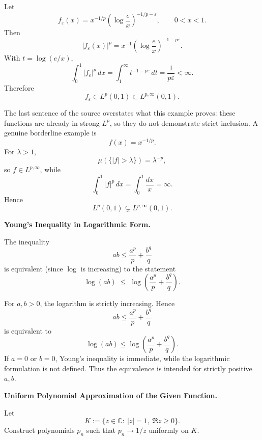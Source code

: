 \begin{solution}
Let
\[
f_\varepsilon(x)
=
x^{-1/p}
\left(\log\frac ex\right)^{-1/p-\varepsilon},
\qquad 0<x<1.
\]
Then
\[
|f_\varepsilon(x)|^p
=
x^{-1}
\left(\log\frac ex\right)^{-1-p\varepsilon}.
\]
With \(t=\log(e/x)\),
\[
\int_0^1|f_\varepsilon|^p\,dx
=
\int_1^\infty t^{-1-p\varepsilon}\,dt
=
\frac1{p\varepsilon}<\infty.
\]
Therefore
\[
\boxed{
f_\varepsilon\in L^p(0,1)\subset L^{p,\infty}(0,1).
}
\]

The last sentence of the source overstates what this example proves: these functions are
already in strong \(L^p\), so they do not demonstrate strict inclusion. A genuine borderline
example is
\[
f(x)=x^{-1/p}.
\]
For \(\lambda>1\),
\[
\mu(\{|f|>\lambda\})=\lambda^{-p},
\]
so \(f\in L^{p,\infty}\), while
\[
\int_0^1|f|^p\,dx
=
\int_0^1\frac{dx}{x}
=
\infty.
\]
Hence
\[
\boxed{
L^p(0,1)\subsetneq L^{p,\infty}(0,1).
}
\]
\end{solution}


\begin{problem}[CP-II-0382]
\label{prob:cp-ii-0382}
\textbf{Young's Inequality in Logarithmic Form.}

\hspace*{1.5em}The inequality
	\[
	ab \le \frac{a^p}{p} + \frac{b^q}{q}
	\]
	is equivalent (since $\log$ is increasing) to the statement
	\[
	\log(ab) \;\le\;
	\log\!\left(\frac{a^p}{p} + \frac{b^q}{q}\right).
	\]
\end{problem}

\begin{solution}
For \(a,b>0\), the logarithm is strictly increasing. Hence
\[
ab
\le
\frac{a^p}{p}+\frac{b^q}{q}
\]
is equivalent to
\[
\boxed{
\log(ab)
\le
\log\left(
\frac{a^p}{p}+\frac{b^q}{q}
\right).
}
\]
If \(a=0\) or \(b=0\), Young's inequality is immediate, while the logarithmic formulation is
not defined. Thus the equivalence is intended for strictly positive \(a,b\).
\end{solution}


\begin{problem}[CP-II-0384]
\label{prob:cp-ii-0384}
\textbf{Uniform Polynomial Approximation of the Given Function.}

	Let
	\[
	K:=\{z\in\mathbb C:\ |z|=1,\ \Re z\ge 0\}.
	\]
	Construct polynomials $p_n$ such that $p_n\to 1/z$ uniformly on $K$.
\end{problem}

